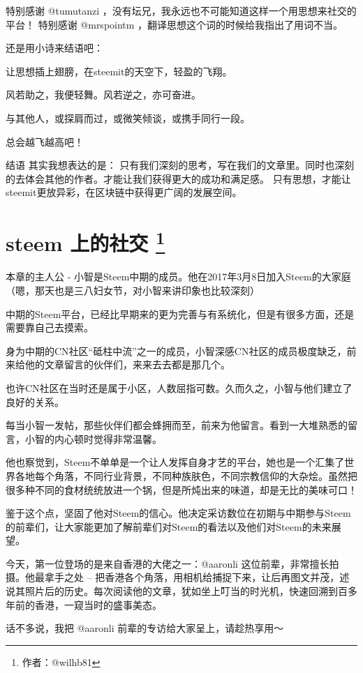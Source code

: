 \documentclass[]{ctexbook}
\begin{document}
特别感谢 @tumutanzi ，没有坛兄，我永远也不可能知道这样一个用思想来社交的平台！
特别感谢 @mrspointm ，翻译思想这个词的时候给我指出了用词不当。

还是用小诗来结语吧：

让思想插上翅膀，在steemit的天空下，轻盈的飞翔。

风若助之，我便轻舞。风若逆之，亦可奋进。

与其他人，或探肩而过，或微笑倾谈，或携手同行一段。

总会越飞越高吧！

结语
其实我想表达的是：
只有我们深刻的思考，写在我们的文章里。同时也深刻的去体会其他的作者。才能让我们获得更大的成功和满足感。
只有思想，才能让steemit更放异彩，在区块链中获得更广阔的发展空间。

\hypertarget{social}{%
\section[steem 上的社交 ]{\texorpdfstring{steem 上的社交 \footnote{作者：@wilhb81}}{steem 上的社交 }}\label{social}}

本章的主人公 - 小智是Steem中期的成员。他在2017年3月8日加入Steem的大家庭（嗯，那天也是三八妇女节，对小智来讲印象也比较深刻）

中期的Steem平台，已经比早期来的更为完善与有系统化，但是有很多方面，还是需要靠自己去摸索。

身为中期的CN社区``砥柱中流''之一的成员，小智深感CN社区的成员极度缺乏，前来给他的文章留言的伙伴们，来来去去都是那几个。

也许CN社区在当时还是属于小区，人数屈指可数。久而久之，小智与他们建立了良好的关系。

每当小智一发帖，那些伙伴们都会蜂拥而至，前来为他留言。看到一大堆熟悉的留言，小智的内心顿时觉得非常温馨。

他也察觉到，Steem不单单是一个让人发挥自身才艺的平台，她也是一个汇集了世界各地每个角落，不同行业背景，不同种族肤色，不同宗教信仰的大杂烩。虽然把很多种不同的食材统统放进一个锅，但是所炖出来的味道，却是无比的美味可口！

鉴于这个点，坚固了他对Steem的信心。他决定采访数位在初期与中期参与Steem的前辈们，让大家能更加了解前辈们对Steem的看法以及他们对Steem的未来展望。

今天，第一位登场的是来自香港的大佬之一：@aaronli 这位前辈，非常擅长拍摄。他最拿手之处 -- 把香港各个角落，用相机给捕捉下来，让后再图文并茂，述说其照片后的历史。每次阅读他的文章，犹如坐上叮当的时光机，快速回溯到百多年前的香港，一窥当时的盛事美态。

话不多说，我把 @aaronli 前辈的专访给大家呈上，请趁热享用～
\end{document}
